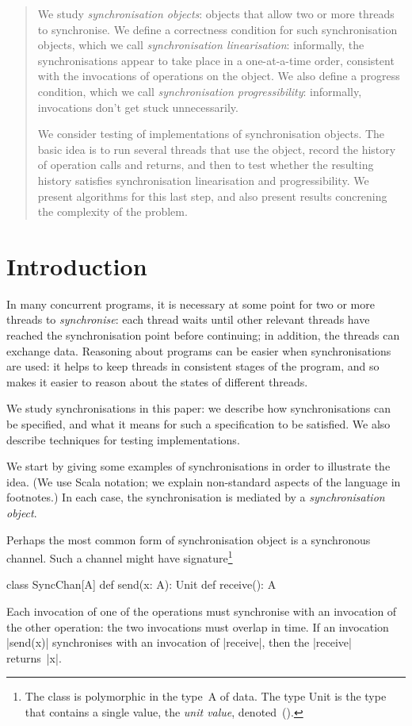 \begin{abstract}
We study \emph{synchronisation objects}: objects that allow two or more
threads to synchronise.  We define a correctness condition for such
synchronisation objects, which we call \emph{synchronisation linearisation}:
informally, the synchronisations appear to take place in a one-at-a-time
order, consistent with the invocations of operations on the object.  We also
define a progress condition, which we call \emph{synchronisation
  progressibility}: informally, invocations don't get stuck unnecessarily. 

We consider testing of implementations of synchronisation objects.  The basic
idea is to run several threads that use the object, record the history of
operation calls and returns, and then to test whether the resulting history
satisfies synchronisation linearisation and progressibility.  We present
algorithms for this last step, and also present results concrening the
complexity of the problem.
\end{abstract}

\section{Introduction}

In many concurrent programs, it is necessary at some point for two or more
threads to \emph{synchronise}: each thread waits until other relevant threads
have reached the synchronisation point before continuing; in addition, the
threads can exchange data.  Reasoning about programs can be easier when
synchronisations are used: it helps to keep threads in consistent stages of
the program, and so makes it easier to reason about the states of different
threads.

We study synchronisations in this paper: we describe how synchronisations can
be specified, and what it means for such a specification to be satisfied.  We
also describe techniques for testing implementations.

We start by giving some examples of synchronisations in order to illustrate
the idea.  (We use Scala notation; we explain non-standard aspects of the
language in footnotes.)  In each case, the synchronisation is mediated by a
\emph{synchronisation object}.

Perhaps the most common form of synchronisation object is a synchronous
channel.  Such a channel might have signature\footnote{The class is
  polymorphic in the type~{\scalashape A} of data.  The type {\scalashape
    Unit} is the type that contains a single value, the \emph{unit value},
  denoted~{\scalashape ()}.}
%
\begin{scala}
class SyncChan[A]{
  def send(x: A): Unit
  def receive(): A
}
\end{scala}
%
Each invocation of one of the operations must synchronise with an invocation
of the other operation: the two invocations must overlap in time.  If an
invocation |send(x)| synchronises with an invocation of |receive|, then the
|receive| returns~|x|.

